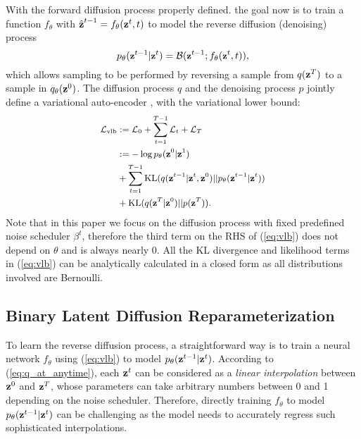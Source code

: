 \documentclass[10pt,twocolumn,letterpaper]{article}
\begin{document}
With the forward diffusion process properly defined. the goal now is to train a function $f_\theta$ with $\hat{\textbf{z}}^{t-1} = f_\theta(\textbf{z}^t, t)$ to model the reverse diffusion (denoising) process 
\begin{equation}
\small
    p_\theta(\textbf{z}^{t-1} | \textbf{z}^t) = \mathcal{B}({\textbf{z}^{t-1}; f_\theta(\textbf{z}^t, t)}), 
\end{equation}
which allows sampling to be performed by reversing a sample from $q(\textbf{z}^T)$ to a sample in $q_\theta(\textbf{z}^0)$.
The diffusion process $q$ and the denoising process $p$ jointly define a variational auto-encoder \cite{vae}, with the variational lower bound:
\begin{equation}
\small
\begin{aligned}
\label{eq:vlb}
    \mathcal{L}_{\text{vlb}} &:= \mathcal{L}_0 + \sum_{t=1}^{T-1} \mathcal{L}_t + \mathcal{L}_T \\
                             &:= -\log p_\theta(\textbf{z}^0 | \textbf{z}^1) \\
                             &+ \sum_{t=1}^{T-1} \text{KL}(q(\textbf{z}^{t-1}|\textbf{z}^t, \textbf{z}^0) || p_\theta(\textbf{z}^{t-1}|\textbf{z}^t)) \\
                             &+\text{KL}(q(\textbf{z}^T|\textbf{z}^0)|| p(\textbf{z}^T)). 
\end{aligned}
\end{equation}
Note that in this paper we focus on the diffusion process with fixed predefined noise scheduler $\beta^t$, therefore the third term on the RHS of (\ref{eq:vlb}) does not depend on $\theta$ and is always nearly $0$.
All the KL divergence and likelihood terms in (\ref{eq:vlb}) can be analytically calculated in a closed form as all distributions involved are Bernoulli.


\subsection{Binary Latent Diffusion Reparameterization}
To learn the reverse diffusion process, a straightforward way is to train a neural network $f_\theta$ using (\ref{eq:vlb}) to model $p_\theta(\textbf{z}^{t-1}|\textbf{z}^t)$.
According to (\ref{eq:q_at_anytime}), each $\textbf{z}^t$ can be considered as a \textit{linear interpolation} between $\textbf{z}^0$ and $\textbf{z}^T$, whose parameters can take arbitrary numbers between 0 and 1 depending on the noise scheduler. Therefore,
directly training $f_\theta$ to model $p_\theta(\textbf{z}^{t-1}|\textbf{z}^t)$ can be challenging as the model needs to accurately regress such sophisticated interpolations. 
\end{document}
